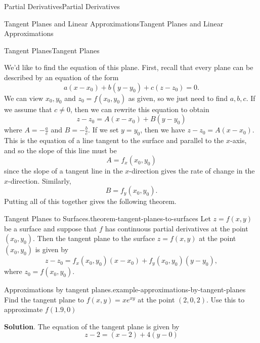 \documentclass[10pt,]{book}
\numberwithin{equation}{section}
\begin{document}
\begin{chapterptx}{Partial Derivatives}{}{Partial Derivatives}{}{}
\begin{sectionptx}{Tangent Planes and Linear Approximations}{}{Tangent Planes and Linear Approximations}{}{}
\begin{subsectionptx}{Tangent Planes}{}{Tangent Planes}{}{}
\par
\hypertarget{p-1154}{}%
We'd like to find the equation of this plane. First, recall that every plane can be described by an equation of the form%
\begin{equation*}
a(x-x_{0})+b(y-y_{0})+c(z-z_{0}) = 0.
\end{equation*}
We can view \(x_{0},y_{0}\) and \(z_{0} = f(x_{0},y_{0})\) as given, so we just need to find \(a,b,c\). If we assume that \(c\neq 0\), then we can rewrite this equation to obtain%
\begin{equation*}
z-z_{0} = A(x-x_{0}) + B(y-y_{0})
\end{equation*}
where \(A = -\frac{a}{c}\) and \(B = -\frac{b}{c}\). If we set \(y=y_{0}\), then we have \(z-z_{0} = A(x-x_{0})\). This is the equation of a line tangent to the surface and parallel to the \(x\)-axis, and so the slope of this line must be%
\begin{equation*}
A = f_{x}(x_{0},y_{0})
\end{equation*}
since the slope of a tangent line in the \(x\)-direction gives the rate of change in the \(x\)-direction. Similarly,%
\begin{equation*}
B = f_{y}(x_{0},y_{0}).
\end{equation*}
Putting all of this together gives the following theorem.%
\begin{theorem}{Tangent Planes to Surfaces.}{}{theorem-tangent-planes-to-surfaces}%
\hypertarget{p-1155}{}%
Let \(z = f(x,y)\) be a surface and suppose that \(f\) has continuous partial derivatives at the point \((x_{0},y_{0})\). Then the tangent plane to the surface \(z = f(x,y)\) at the point \((x_{0},y_{0})\) is given by%
\begin{equation*}
z - z_{0} = f_{x}(x_{0},y_{0})(x - x_{0}) + f_{y}(x_{0},y_{0})(y - y_{0}),
\end{equation*}
where \(z_{0} = f(x_{0},y_{0})\).%
\end{theorem}
\begin{example}{Approximations by tangent planes.}{example-approximations-by-tangent-planes}%
\hypertarget{p-1156}{}%
Find the tangent plane to \(f(x,y) = xe^{xy}\) at the point \((2,0,2)\). Use this to approximate \(f(1.9,0)\)%
\par\smallskip%
\noindent\textbf{Solution}.\hypertarget{solution-179}{}\quad%
\hypertarget{p-1157}{}%
The equation of the tangent plane is given by%
\begin{equation*}
z - 2 = (x - 2) + 4(y - 0)
\end{equation*}

\end{example}
\end{subsectionptx}
\end{sectionptx}
\end{chapterptx}
\end{document}
